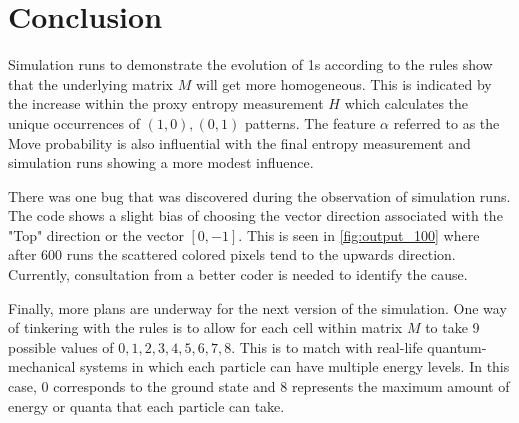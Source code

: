 \chapter{Conclusion}
\noindent
Simulation runs to demonstrate the evolution of 1s according to the rules show that the underlying matrix $M$ will get more homogeneous. This is indicated by the increase within the proxy entropy measurement $H$ which calculates the unique occurrences of $(1,0), (0,1)$ patterns. The feature $\alpha$ referred to as the Move probability is also influential with the final entropy measurement and simulation runs showing a more modest influence.   \par

\vspace{0.3cm}
\noindent
There was one bug that was discovered during the observation of simulation runs. The code shows a slight bias of choosing the vector direction associated with the "Top" direction or the vector $[0, -1]$. This is seen in \ref{fig:output_100} where after 600 runs the scattered colored pixels tend to the upwards direction. Currently, consultation from a better coder is needed to identify the cause. \par

\vspace{0.3cm}
\noindent
Finally, more plans are underway for the next version of the simulation. One way of tinkering with the rules is to allow for each cell within matrix $M$ to take 9 possible values of $0, 1, 2, 3, 4, 5, 6, 7, 8$. This is to match with real-life quantum-mechanical systems in which each particle can have multiple energy levels. In this case, 0 corresponds to the ground state and 8 represents the maximum amount of energy or quanta that each particle can take. \par

